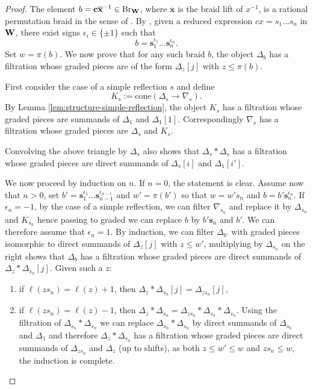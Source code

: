 \documentclass[article, 10pt, oneside, reqno]{amsart}
\theoremstyle{plain}
\theoremstyle{definition}
\theoremstyle{remark}
\newcommand{\cbf}{\mathbf{c}}
\newcommand{\sbf}{\mathbf{s}}
\newcommand{\xbf}{\mathbf{x}}
\begin{document}
\begin{proof}
The element $b = \cbf\overline{\xbf}^{-1} \in \Br_{\Wbf}$, where $\overline{\xbf}$ is the braid lift of $x^{-1}$, is a rational permutation braid in the sense of \cite[Definition 4.2]{DigneGobet}. By \cite[Lemma 4.4]{DigneGobet}, given a reduced expression $cx = s_1\dots s_n$ in $\mathbf{W}$, there exist signs $\epsilon_i \in \{\pm 1\}$ such that
$$b = \sbf_1^{\epsilon_1} \dots \sbf_n^{\epsilon_n}.$$
Set $w = \pi(b)$. We now prove that for any such braid $b$, the object $\Delta_b$ has a filtration whose graded pieces are of the form $\Delta_z[j]$ with $z \leq \pi(b)$.

First consider the case of a simple reflection $s$ and define
$$K_s := \mathrm{cone}(\Delta_s \to \nabla_s).$$
By Lemma \ref{lem:structure-simple-reflection}, the object $K_s$ has a filtration whose graded pieces are summands of $\Delta_1$ and $\Delta_1[1]$. Correspondingly $\nabla_s$ has a filtration whose graded pieces are $\Delta_s$ and $K_s$. 

Convolving the above triangle by $\Delta_s$ also shows that $\Delta_s * \Delta_s$ has a filtration whose graded pieces are direct summands of $\Delta_s[i]$ and $\Delta_1[i']$. 

We now proceed by induction on $n$. If $n = 0$, the statement is clear. Assume now that $n > 0$, set $b' = \sbf_1^{\epsilon_1} \dots \sbf_{n-1}^{\epsilon_{n-1}}$ and $w' = \pi(b')$ so that $w = w's_n$ and $b = b'\sbf_n^{\epsilon_n}$. If $\epsilon_n = -1$, by the case of a simple reflection, we can filter $\nabla_{s_n}$ and replace it by $\Delta_{s_n}$ and $K_{s_n}$ hence passing to graded we can replace $b$ by $b'\sbf_n$ and $b'$. We can therefore assume that $\epsilon_n = 1$. By induction, we can filter $\Delta_{b'}$ with graded pieces isomorphic to direct summands of $\Delta_{z}[j]$ with $z \leq w'$, multiplying by $\Delta_{s_n}$ on the right shows that $\Delta_b$ has a filtration whose graded pieces are direct summands of $\Delta_z * \Delta_{s_n}[j]$. Given such a $z$: 
\begin{enumerate}
\item if $\ell(zs_n) = \ell(z) + 1$, then $\Delta_z * \Delta_{s_n}[j] = \Delta_{zs_n}[j]$, 
\item if $\ell(zs_n) = \ell(z) -  1$, then $\Delta_z * \Delta_{s_n} = \Delta_{zs_n} * \Delta_{s_n} * \Delta_{s_n}$. Using the filtration of $\Delta_{s_n} * \Delta_{s_n}$ we can replace $\Delta_{s_n} * \Delta_{s_n}$ by direct summands of $\Delta_{s_n}$ and $\Delta_1$ and therefore $\Delta_z * \Delta_{s_n}$ has a filtration whose graded pieces are direct summands of $\Delta_{zs_n}$ and $\Delta_{z}$ (up to shifts), as both $z \leq w' \leq w$ and $zs_n \leq w$, the induction is complete.
\end{enumerate}


\end{proof}
\end{document}
